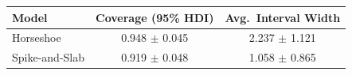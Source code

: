 \begin{tabular}{lcc}
\toprule
Model & Coverage (95\% HDI) & Avg.\ Interval Width \\
\midrule
Horseshoe & 0.948 $\pm$ 0.045 & 2.237 $\pm$ 1.121 \\
Spike-and-Slab & 0.919 $\pm$ 0.048 & 1.058 $\pm$ 0.865 \\
\bottomrule
\end{tabular}